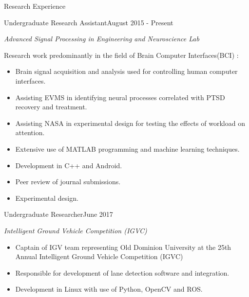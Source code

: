 \documentclass{resume} %
\begin{document}
\begin{rSection}{Research Experience}

\begin{rSubsection}{ Undergraduate Research Assistant}{August 2015 - Present}{}{}
\item[] \emph{Advanced Signal Processing in Engineering and Neuroscience Lab}
\item[] Research work predominantly in the field of Brain Computer Interfaces(BCI) : 
\begin{itemize}
	 \setlength\itemsep{-.5em} 
 \item Brain signal acquisition and analysis used for controlling human computer interfaces.
 \item Assisting EVMS in identifying neural processes correlated with PTSD recovery and treatment.
 \item Assisting NASA in experimental design for testing the effects of workload on attention. 
 \item Extensive use of MATLAB programming and machine learning techniques.
 \item Development in C++ and Android.
 \item Peer review of journal submissions. 
 \item Experimental design.  
\end{itemize}
\end{rSubsection}

\vspace{-5 pt}

\begin{rSubsection}{Undergraduate Researcher}{June 2017}{}{}
\item[] \emph{ Intelligent Ground Vehicle Competition (IGVC)}
\begin{itemize}
	 \setlength\itemsep{-.5em} 
	\item Captain of IGV team representing Old Dominion University at the 25th Annual Intelligent Ground Vehicle Competition (IGVC)
	\item Responsible for development of lane detection software and integration.
	\item Development in Linux with use of Python, OpenCV and ROS.
\end{itemize}
\end{rSubsection}

\end{rSection}


\vspace{-5 pt}
\end{document}
